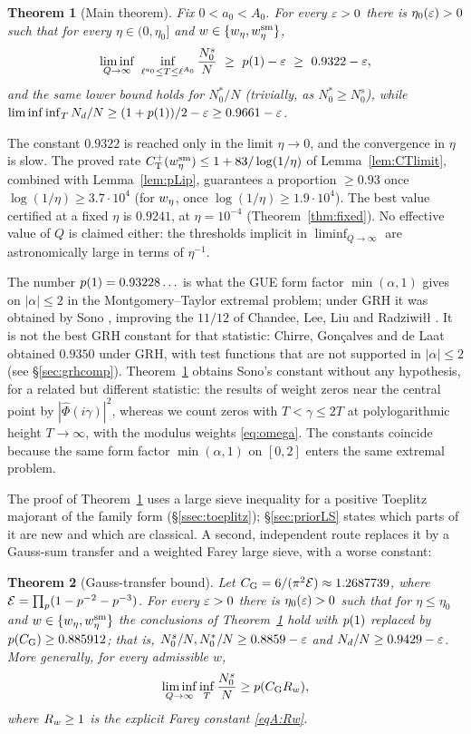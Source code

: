\documentclass[11pt]{amsart}
\newtheorem{theorem}{Theorem}[section]
\theoremstyle{definition}
\theoremstyle{remark}
\numberwithin{equation}{section}
\begin{document}
\begin{theorem}[Main theorem]\label{thm:main}
Fix $0<a_0<A_0$. For every $\varepsilon>0$ there is $\eta_0(\varepsilon)>0$ such that for every $\eta\in(0,\eta_0]$ and $w\in\{w_\eta,w^{\mathrm{sm}}_\eta\}$,
\[
\liminf_{Q\to\infty}\ \inf_{\ell^{a_0}\le T\le\ell^{A_0}}\frac{N^s_0}{N}\ \ge\ \pC(1)-\eps\ \ge\ 0.9322-\eps,
\]
and the same lower bound holds for $N^*_0/N$ (trivially, as $N^*_0\ge N^s_0$), while $\liminf\inf_T N_d/N\ge(1+p(1))/2-\varepsilon\ge0.9661-\varepsilon$.
\end{theorem}

The constant $0.9322$ is reached only in the limit $\eta\to0$, and the convergence in $\eta$ is slow. The proved rate $C^{+}_{\mathrm T}(w^{\mathrm{sm}}_\eta)\le1+83/\log(1/\eta)$ of Lemma~\ref{lem:CTlimit}, combined with Lemma~\ref{lem:pLip}, guarantees a proportion $\ge0.93$ once $\log(1/\eta)\ge3.7\cdot10^4$ (for $w_\eta$, once $\log(1/\eta)\ge1.9\cdot10^4$). The best value certified at a fixed $\eta$ is $0.9241$, at $\eta=10^{-4}$ (Theorem~\ref{thm:fixed}). No effective value of $Q$ is claimed either: the thresholds implicit in $\liminf_{Q\to\infty}$ are astronomically large in terms of $\eta^{-1}$.

The number $p(1)=0.93228\ldots$ is what the GUE form factor $\min(\alpha,1)$ gives on $|\alpha|\le2$ in the Montgomery--Taylor extremal problem; under GRH it was obtained by Sono \cite{Sono16}, improving the $11/12$ of Chandee, Lee, Liu and Radziwi\l\l{} \cite{CLLR}. It is not the best GRH constant for that statistic: Chirre, Gon\c calves and de Laat \cite[Theorem~5]{CGdL} obtained $0.9350$ under GRH, with test functions that are not supported in $|\alpha|\le2$ (see \S\ref{sec:grhcomp}). Theorem~\ref{thm:main} obtains Sono's constant without any hypothesis, for a related but different statistic: the results of \cite{CLLR,Sono16,CGdL} weight zeros near the central point by $|\widehat\Phi(i\gamma)|^2$, whereas we count zeros with $T<\gamma\le2T$ at polylogarithmic height $T\to\infty$, with the modulus weights \eqref{eq:omega}. The constants coincide because the same form factor $\min(\alpha,1)$ on $[0,2]$ enters the same extremal problem.

The proof of Theorem~\ref{thm:main} uses a large sieve inequality for a positive Toeplitz majorant of the family form (\S\ref{ssec:toeplitz}); \S\ref{sec:priorLS} states which parts of it are new and which are classical. A second, independent route replaces it by a Gauss-sum transfer and a weighted Farey large sieve, with a worse constant:

\begin{theorem}[Gauss-transfer bound]\label{thm:gauss}
Let $C_{\mathrm G}=6/(\pi^2\mathcal E)\approx1.2687739$, where $\mathcal E=\prod_p(1-p^{-2}-p^{-3})$. For every $\varepsilon>0$ there is $\eta_0(\varepsilon)>0$ such that for $\eta\le\eta_0$ and $w\in\{w_\eta,w^{\mathrm{sm}}_\eta\}$ the conclusions of Theorem~\ref{thm:main} hold with $p(1)$ replaced by $p(C_{\mathrm G})\ge0.885912$; that is, $N^s_0/N,N^*_0/N\ge0.8859-\varepsilon$ and $N_d/N\ge0.9429-\varepsilon$. More generally, for every admissible $w$,
\[
\liminf_{Q\to\infty}\inf_{T}\frac{N^s_0}{N}\ge p(C_{\mathrm G}R_w),
\]
where $R_w\ge1$ is the explicit Farey constant \eqref{eqA:Rw}.
\end{theorem}
\end{document}
